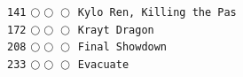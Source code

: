 \documentclass[a4paper,landscape]{article}
\begin{document}
\begin{multicols*}{5}
\texttt{141} \(\bigcirc\!\bigcirc\!\bigcirc\)  \texttt{Kylo Ren, Killing the Pas} \vspace{-0.3mm}\\ 
\texttt{172} \(\bigcirc\!\bigcirc\!\bigcirc\)  \texttt{Krayt Dragon} \vspace{-0.3mm}\\ 
\texttt{208} \(\bigcirc\!\bigcirc\!\bigcirc\)  \texttt{Final Showdown} \vspace{-0.3mm}\\ 
\texttt{233} \(\bigcirc\!\bigcirc\!\bigcirc\)  \texttt{Evacuate} \vspace{-0.3mm}\\ 

\end{multicols*}
\end{document}
